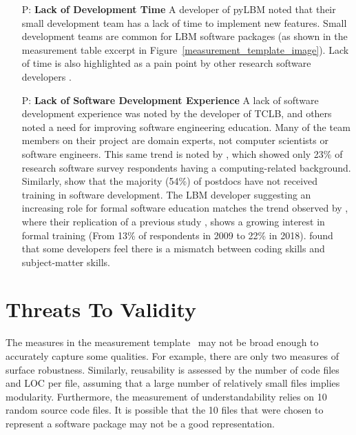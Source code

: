 \documentclass[runningheads]{llncs}
\newcounter{pnum} %
\begin{document}
\begin{enumerate}

	\item[P\refstepcounter{pnum}\thepnum \label{P_LackDevTime}:] \textbf{Lack of
	Development Time} A developer of pyLBM noted that their small development
	team has a lack of time to implement new features. Small development teams
	are common for LBM software packages (as shown in the measurement table
	excerpt in Figure~\ref{measurement_template_image}). Lack of time is also
	highlighted as a pain point by other research software developers
	\cite{PintoEtAl2018,WieseEtAl2019}.

	\item[P\refstepcounter{pnum}\thepnum \label{P_LackSoftDevExp}:] \textbf{Lack
	of Software Development Experience} A lack of software development
	experience was noted by the developer of TCLB, and others noted a need for
	improving software engineering education. Many of the team members on their
	project are domain experts, not computer scientists or software engineers.
	This same trend is noted by \cite{Nguyen-HoanEtAl2010}, which showed only
	23\% of research software survey respondents having a computing-related
	background. Similarly, \cite{UditAndKatz2017} show that the majority (54\%)
	of postdocs have not received training in software development.  The LBM
	developer suggesting an increasing role for formal software education
	matches the trend observed by \cite{PintoEtAl2018}, where their replication
	of a previous study \cite{HannayEtAl2009}, shows a growing interest in
	formal training (From 13\% of respondents in 2009 to 22\% in 2018).
	\cite{PintoEtAl2018} found that some developers feel there is a mismatch
	between coding skills and subject-matter skills. 
	
\end{enumerate}

\section{Threats To Validity} \label{threats}

The measures in the measurement template~\cite{SmithEtAl2021} may not be broad
enough to accurately capture some qualities. For example, there are only two
measures of surface robustness. Similarly, reusability is assessed by the number
of code files and LOC per file, assuming that a large number of relatively small
files implies modularity. Furthermore, the measurement of understandability
relies on 10 random source code files. It is possible that the 10 files that
were chosen to represent a software package may not be a good representation.
\end{document}
